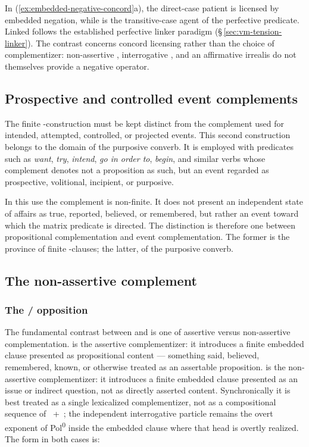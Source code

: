 In (\ref{ex:embedded-negative-concord}a), the direct-case patient 
is licensed by embedded negation, while  is the transitive-case
agent of the perfective predicate. Linked  follows the
established perfective linker paradigm (§\,\ref{sec:vm-tension-linker}). The contrast
concerns concord licensing rather than the choice of complementizer:
non-assertive , interrogative , and an affirmative
irrealis do not themselves provide a negative operator.

\subsection{Prospective and controlled event complements}

The finite -construction must be kept distinct from the complement used
for intended, attempted, controlled, or projected events. This second
construction belongs to the domain of the purposive converb. It is employed with
predicates such as \textit{want}, \textit{try}, \textit{intend}, \textit{go in
order to}, \textit{begin}, and similar verbs whose complement denotes not a
proposition as such, but an event regarded as prospective, volitional,
incipient, or purposive.

In this use the complement is non-finite. It does not present an independent
state of affairs as true, reported, believed, or remembered, but rather an event
toward which the matrix predicate is directed. The distinction is therefore one
between propositional complementation and event complementation. The former is
the province of finite -clauses; the latter, of the purposive converb.

\subsection{The non-assertive complement }\label{sec:poby}

\subsubsection{The  /  opposition}

The fundamental contrast between  and  is one of assertive
versus non-assertive complementation.  is the assertive complementizer:
it introduces a finite embedded clause presented as propositional content ---
something said, believed, remembered, known, or otherwise treated as an
assertable proposition.  is the non-assertive complementizer: it
introduces a finite embedded clause presented as an issue or indirect question,
not as directly asserted content. Synchronically it is best treated as a
single lexicalized complementizer, not as a compositional sequence of
~+~; the independent interrogative particle  remains the
overt exponent of Pol\textsuperscript{0} inside the embedded clause where that
head is overtly realized. The form in both cases is:

